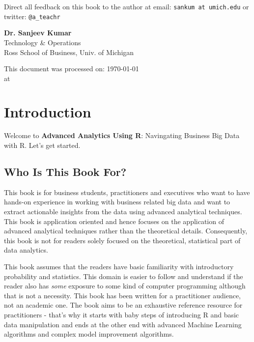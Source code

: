 \documentclass[11pt, letterpaper, twoside]{memoir}\usepackage{knitr}
\newcommand{\chapterendsymbol}{
    \vspace{24pt}
    \Huge
    \hrulefill \hspace{0.1in} \floweroneleft\floweroneright \hspace{0.1in} \hrulefill
    \normalsize
    }
\begin{document}
Direct all feedback on this book to the author at email: \texttt{sankum at umich.edu} or twitter: \texttt{@a\_teachr}

\vspace{12pt}

\begin{flushright}
\textbf{Dr. Sanjeev Kumar} \\
Technology \& Operations \\
Ross School of Business, Univ. of Michigan

This document was processed on: \today \\ at \printtime
\end{flushright}
\chapterendsymbol





\chapter*{Introduction}

Welcome to \textbf{Advanced Analytics Using R}: Navingating Business Big Data with R. Let's get started.

\section*{Who Is This Book For?}

This book is for business students, practitioners and executives who want to have hands-on experience in working with business related big data and want to extract actionable insights from the data using advanced analytical techniques. This book is application oriented and hence focuses on the application of advanced analytical techniques rather than the theoretical details. Consequently, this book is not for readers solely focused on the theoretical, statistical part of data analytics. 

This book assumes that the readers have basic familiarity with introductory probability and statistics. This domain is easier to follow and understand if the reader also has \textit{some} exposure to some kind of computer programming although that is not a necessity. This book has been written for a practitioner audience, not an academic one. The book aims to be an exhaustive reference resource for practitioners - that's why it starts with baby steps of introducing R and basic data manipulation and ends at the other end with advanced Machine Learning algorithms and complex model improvement algorithms.
\end{document}

